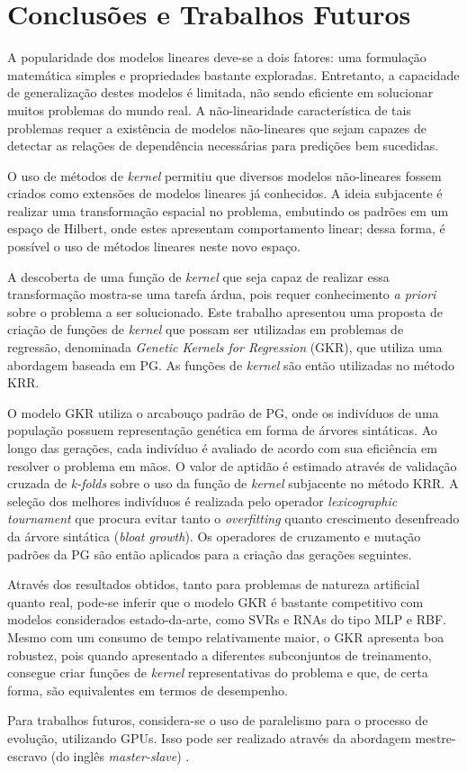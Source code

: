 \chapter{Conclusões e Trabalhos Futuros} \label{chapter:conclusions}

A popularidade dos modelos lineares deve-se a dois fatores: uma formulação matemática simples e propriedades bastante exploradas. Entretanto, a capacidade de generalização destes modelos é limitada, não sendo eficiente em solucionar muitos problemas do mundo real. A não-linearidade característica de tais problemas requer a existência de modelos não-lineares que sejam capazes de detectar as relações de dependência necessárias para predições bem sucedidas.

O uso de métodos de \textit{kernel} permitiu que diversos modelos não-lineares fossem criados como extensões de modelos lineares já conhecidos. A ideia subjacente é realizar uma transformação espacial no problema, embutindo os padrões em um espaço de Hilbert, onde estes apresentam comportamento linear; dessa forma, é possível o uso de métodos lineares neste novo espaço.

A descoberta de uma função de \textit{kernel} que seja capaz de realizar essa transformação mostra-se uma tarefa árdua, pois requer conhecimento \textit{a priori} sobre o problema a ser solucionado. Este trabalho apresentou uma proposta de criação de funções de \textit{kernel} que possam ser utilizadas em problemas de regressão, denominada \textit{Genetic Kernels for Regression} (GKR), que utiliza uma abordagem baseada em PG. As funções de \textit{kernel} são então utilizadas no método KRR.

O modelo GKR utiliza o arcabouço padrão de PG, onde os indivíduos de uma população possuem representação genética em forma de árvores sintáticas. Ao longo das gerações, cada indivíduo é avaliado de acordo com sua eficiência em resolver o problema em mãos. O valor de aptidão é estimado através de validação cruzada de \textit{k-folds} sobre o uso da função de \textit{kernel} subjacente no método KRR. A seleção dos melhores indivíduos é realizada pelo operador \textit{lexicographic tournament} que procura evitar tanto o \textit{overfitting} quanto crescimento desenfreado da árvore sintática (\textit{bloat growth}). Os operadores de cruzamento e mutação padrões da PG são então aplicados para a criação das gerações seguintes.

Através dos resultados obtidos, tanto para problemas de natureza artificial quanto real, pode-se inferir que o modelo GKR é bastante competitivo com modelos considerados estado-da-arte, como SVRs e RNAs do tipo MLP e RBF. Mesmo com um consumo de tempo relativamente maior, o GKR apresenta boa robustez, pois quando apresentado a diferentes subconjuntos de treinamento, consegue criar funções de \textit{kernel} representativas do problema e que, de certa forma, são equivalentes em termos de desempenho.

Para trabalhos futuros, considera-se o uso de paralelismo para o processo de evolução, utilizando GPUs. Isso pode ser realizado através da abordagem mestre-escravo (do inglês \textit{master-slave}) \cite{oussadeine1997}.
